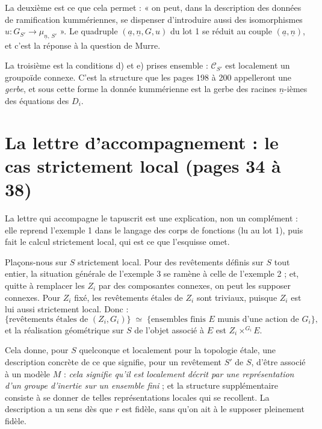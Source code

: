 \documentclass[11pt,a4paper]{article}
\begin{document}
La deuxième est ce que cela permet : « on peut, dans la description des données
de ramification kummériennes, se dispenser d'introduire aussi des isomorphismes
$u : G_{S'} \to \mu_{\underline{n},\,S'}$ ». Le quadruple
$(\underline{a}, \underline{n}, G, u)$ du lot 1 se réduit au couple
$(\underline{a}, \underline{n})$, et c'est la réponse à la question de Murre.

La troisième est la conditions d) et e) prises ensemble : $\mathcal{C}_{S'}$
est localement un groupoïde connexe. C'est la structure que les pages 198 à 200
appelleront une \emph{gerbe}, et sous cette forme la donnée kummérienne est la
gerbe des racines $\underline{n}$-ièmes des équations des $D_{i}$.

\section*{La lettre d'accompagnement : le cas strictement local (pages 34 à 38)}

La lettre qui accompagne le tapuscrit est une explication, non un complément :
elle reprend l'exemple 1 dans le langage des corps de fonctions (lu au lot 1),
puis fait le calcul strictement local, qui est ce que l'esquisse omet.

Plaçons-nous sur $S$ strictement local. Pour des revêtements définis sur $S$
tout entier, la situation générale de l'exemple 3 se ramène à celle de
l'exemple 2 ; et, quitte à remplacer les $Z_{i}$ par des composantes connexes,
on peut les supposer connexes. Pour $Z_{i}$ fixé, les revêtements étales de
$Z_{i}$ sont triviaux, puisque $Z_{i}$ est lui aussi strictement local. Donc :
\[
  \bigl\{\text{revêtements étales de } (Z_{i}, G_{i})\bigr\}
  \;\simeq\;
  \bigl\{\text{ensembles finis } E \text{ munis d'une action de } G_{i}\bigr\} ,
\]
et la réalisation géométrique sur $S$ de l'objet associé à $E$ est
$Z_{i} \times^{G_{i}} E$.

Cela donne, pour $S$ quelconque et localement pour la topologie étale, une
description concrète de ce que signifie, pour un revêtement $S'$ de $S$, d'être
associé à un modèle $M$ : \emph{cela signifie qu'il est localement décrit par
une représentation d'un groupe d'inertie sur un ensemble fini} ; et la
structure supplémentaire consiste à se donner de telles représentations locales
qui se recollent. La description a un sens dès que $r$ est fidèle, sans qu'on
ait à le supposer pleinement fidèle.
\end{document}
